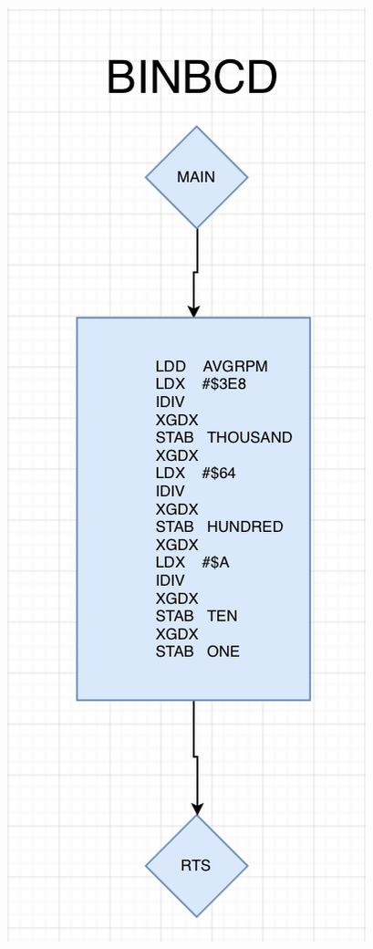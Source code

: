 \documentclass[12pt]{report}
\begin{document}
\begin{center}
     \includegraphics[scale=0.66]{bin.PNG}

\end{center}
\end{document}
